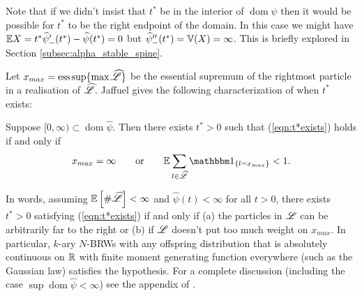 \begin{remark}
Note that if we didn't insist that $t^*$ be in the interior of $\operatorname*{dom} \widehat{\psi}$ then it would be possible for $t^*$ to be the right endpoint of the domain. In this case we might have $\mathbb{E} X = t^* \widehat{\psi}'_-(t^*) - \widehat{\psi}(t^*) = 0$ but $\widehat{\psi}''_-(t^*) = \mathbb{V}(X) = \infty$. This is briefly explored in Section \ref{subsec:alpha_stable_spine}. 
\end{remark}
Let $x_{max} = \operatorname*{ess\,sup} \{\max\widehat{\mathscr{L}}\}$ be the essential supremum of the rightmost particle in a realisation of $\widehat{\mathscr{L}}$. Jaffuel gives the following characterization of when $t^*$ exists:
\begin{proposition}\label{prop:jaffuel}
Suppose $[0, \infty) \subset \operatorname*{dom}\widehat{\psi}$. Then there exists $t^* > 0$ such that (\ref{eqn:t*exists}) holds if and only if 
\begin{equation}\nonumber
x_{max} = \infty \qquad \text{or} \qquad\E \sum_{l \in \widehat{\scr{L}}} \Ind_{\{ l = x_{max}\}} < 1. 
\end{equation}
\end{proposition}
In words, assuming $\mathbb{E}\left[ \#\widehat{\mathscr{L}} \right] < \infty$ and $\widehat{\psi}(t) < \infty$ for all $t>0$, there exists $t^* > 0$ satisfying (\ref{eqn:t*exists}) if and only if (a) the particles in $\mathscr{L}$ can be arbitrarily far to the right or (b) if $\mathscr{L}$ doesn't put too much weight on $x_{max}$. In particular, $k$-ary $N$-BRWs with any offspring distribution that is absolutely continuous on $\mathbb{R}$ with finite moment generating function everywhere (such as the Gaussian law) satisfies the hypothesis.  For a complete discussion (including the case $\sup \operatorname*{dom} \widehat{\psi} < \infty$) see the appendix of \cite{jaffuel2227critical}.







